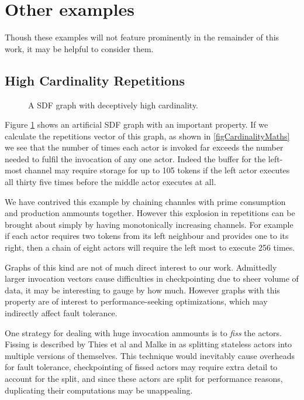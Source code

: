 \section{Other examples}

Thoush these examples will not feature prominently in the remainder of this work, it may be helpful to consider them.

\subsection{High Cardinality Repetitions}

\begin{figure}
\begin{center}
	
\caption{A SDF graph with deceptively high cardinality.}
\label{figCardinality}
\end{center}
\end{figure}

Figure \ref{figCardinality} shows an artificial SDF graph with an important property.
If we calculate the repetitions vector of this graph, as shown in \ref{figCardinalityMaths} we see that the number of times each actor is invoked far exceeds the number needed to fulfil the invocation of any one actor.
Indeed the buffer for the left-most channel may require storage for up to 105 tokens if the left actor executes all thirty five times before the middle actor executes at all.

We have contrived this example by chaining channles with prime consumption and production ammounts together.
However this explosion in repetitions can be brought about simply by having monotonically increasing channels.
For example if each actor requires two tokens from its left neighbour and provides one to its right, then a chain of eight actors will require the left most to execute 256 times.

Graphs of this kind are not of much direct interest to our work.
Admittedly larger invocation vectors cause difficulties in checkpointing due to sheer volume of data, it may be interesting to gauge by how much.
However graphs with this property are of interest to performance-seeking optimizations, which may indirectly affect fault tolerance.

One strategy for dealing with huge invocation ammounts is to {\em fiss} the actors.
Fissing is described by Thies et al and Malke in \cite{thies02, mal08} as splitting stateless actors into multiple versions of themselves.
This technique would inevitably cause overheads for fault tolerance, checkpointing of fissed actors may require extra detail to account for the split, and since these actors are split for performance reasons, duplicating their computations may be unappealing.

